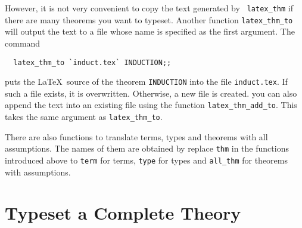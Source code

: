 However, it is not very convenient to copy the text generated by {\tt
latex\_thm} if there are many theorems you want to typeset. Another
function {\tt latex\_thm\_to} will output the text to a file whose
name is specified as the first argument. The command
\begin{verbatim}
  latex_thm_to `induct.tex` INDUCTION;;
\end{verbatim}
puts the \LaTeX\ source of the theorem {\tt INDUCTION} into the file
{\tt induct.tex}. If such a file exists, it is overwritten. Otherwise,
a new file is created. you can also append the text into an existing
file using the function {\tt latex\_thm\_add\_to}. This takes the same
argument as {\tt latex\_thm\_to}.

There are also functions to translate terms, types and theorems with
all assumptions. The names of them are obtained by replace {\tt thm}
in the functions introduced above to {\tt term} for terms, {\tt type} for types
and {\tt all\_thm} for theorems with assumptions. 

\section{Typeset a Complete Theory}

